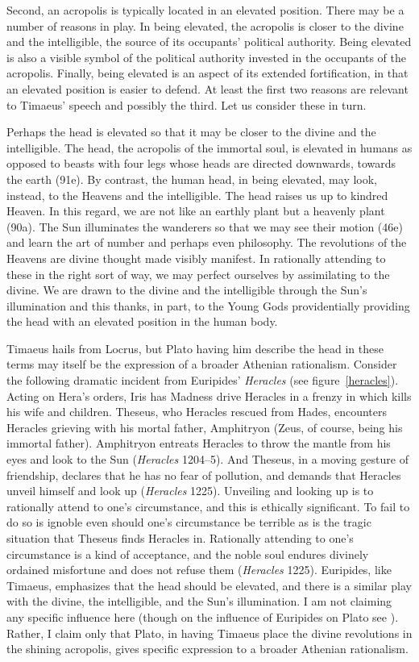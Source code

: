 Second, an acropolis is typically located in an elevated position. There may be a number of reasons in play. In being elevated, the acropolis is closer to the divine and the intelligible, the source of its occupants' political authority. Being elevated is also a visible symbol of the political authority invested in the occupants of the acropolis. Finally, being elevated is an aspect of its extended fortification, in that an elevated position is easier to defend. At least the first two reasons are relevant to Timaeus' speech and possibly the third. Let us consider these in turn.

Perhaps the head is elevated so that it may be closer to the divine and the intelligible. The head, the acropolis of the immortal soul, is elevated in humans as opposed to beasts with four legs whose heads are directed downwards, towards the earth (91e). By contrast, the human head, in being elevated, may look, instead, to the Heavens and the intelligible. The head raises us up to kindred Heaven. In this regard, we are not like an earthly plant but a heavenly plant (90a). The Sun illuminates the wanderers so that we may see their motion (46e) and learn the art of number and perhaps even philosophy. The revolutions of the Heavens are divine thought made visibly manifest. In rationally attending to these in the right sort of way, we may perfect ourselves by assimilating to the divine. We are drawn to the divine and the intelligible through the Sun's illumination and this thanks, in part, to the Young Gods providentially providing the head with an elevated position in the human body. 

Timaeus hails from Locrus, but Plato having him describe the head in these terms may itself be the expression of a broader Athenian rationalism. Consider the following dramatic incident from Euripides' \emph{Heracles} (see figure~\ref{heracles}). Acting on Hera's orders, Iris has Madness drive Heracles in a frenzy in which kills his wife and children. Theseus, who Heracles rescued from Hades, encounters Heracles grieving with his mortal father, Amphitryon (Zeus, of course, being his immortal father). Amphitryon entreats Heracles to throw the mantle from his eyes and look to the Sun (\emph{Heracles} 1204--5). And Theseus, in a moving gesture of friendship, declares that he has no fear of pollution, and demands that Heracles unveil himself and look up (\emph{Heracles} 1225). Unveiling and looking up is to rationally attend to one's circumstance, and this is ethically significant. To fail to do so is ignoble even should one's circumstance be terrible as is the tragic situation that Theseus finds Heracles in. Rationally attending to one's circumstance is a kind of acceptance, and the noble soul endures divinely ordained misfortune and does not refuse them (\emph{Heracles} 1225). Euripides, like Timaeus, emphasizes that the head should be elevated, and there is a similar play with the divine, the intelligible, and the Sun's illumination. I am not claiming any specific influence here (though on the influence of Euripides on Plato see \citealt{Sansone:1996ux}). Rather, I claim only that Plato, in having Timaeus place the divine revolutions in the shining acropolis, gives specific expression to a broader Athenian rationalism.

